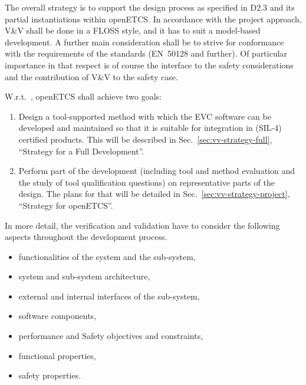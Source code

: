 \documentclass{template/openetcs_report}
\begin{document}

The overall strategy is to support the design process as specified in
D2.3 and its partial instantiations within openETCS. In accordance
with the project approach, V\&V shall be done in a FLOSS style, and it
has to suit a model-based development. A further main consideration
shall be to strive for conformance with the requirements of the
standards (EN~50128 and further). Of particular importance in that
respect is of course the interface to the safety considerations and
the contribution of V\&V to the safety case.

W.r.t.\ \vv, openETCS shall achieve two goals:
\begin{enumerate}
\item Design a tool-supported method with which the EVC software can
  be developed and maintained so that it is suitable for integration
  in (SIL-4) certified products. This will be described in
  Sec.~\ref{sec:vv-strategy-full}, ``\VV Strategy for a Full Development''.
\item Perform part of the development (including tool and method
  evaluation and the study of tool qualification questions) on
  representative parts of the design. The plans for that will be
  detailed in Sec.~\ref{sec:vv-strategy-project}, ``\VV Strategy for openETCS''.
\end{enumerate}

In more detail, the verification and validation have to consider the
following aspects throughout the development process.
%
\begin{itemize}
\item functionalities of the system and the sub-system,
\item system and sub-system architecture,
\item external and internal interfaces of the sub-system,
\item software components,
\item performance and Safety objectives and constraints,
\item functional properties,
\item safety properties.
\end{itemize}
\end{document}
